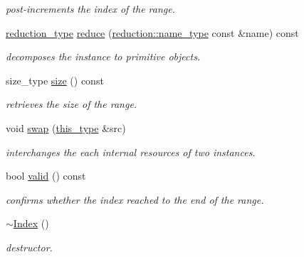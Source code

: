 \begin{DoxyCompactItemize}
\begin{DoxyCompactList}\small\item\em post-\/increments the index of the range. \end{DoxyCompactList}\item 
\hypertarget{classhryky_1_1_index_a5994b0481f6f94baa69e5f4c141b86a7}{\hyperlink{namespacehryky_a343a9a4c36a586be5c2693156200eadc}{reduction\-\_\-type} \hyperlink{classhryky_1_1_index_a5994b0481f6f94baa69e5f4c141b86a7}{reduce} (\hyperlink{namespacehryky_1_1reduction_ac686c30a4c8d196bbd0f05629a6b921f}{reduction\-::name\-\_\-type} const \&name) const }\label{classhryky_1_1_index_a5994b0481f6f94baa69e5f4c141b86a7}

\begin{DoxyCompactList}\small\item\em decomposes the instance to primitive objects. \end{DoxyCompactList}\item 
\hypertarget{classhryky_1_1_index_acbbc20fade7bd82b7ce253ef052a0e9c}{size\-\_\-type \hyperlink{classhryky_1_1_index_acbbc20fade7bd82b7ce253ef052a0e9c}{size} () const }\label{classhryky_1_1_index_acbbc20fade7bd82b7ce253ef052a0e9c}

\begin{DoxyCompactList}\small\item\em retrieves the size of the range. \end{DoxyCompactList}\item 
\hypertarget{classhryky_1_1_index_a5566075def89b43a67fc8d95ff257791}{void \hyperlink{classhryky_1_1_index_a5566075def89b43a67fc8d95ff257791}{swap} (\hyperlink{classhryky_1_1_index_a0dab4f087ed4d752f8d5040163782102}{this\-\_\-type} \&src)}\label{classhryky_1_1_index_a5566075def89b43a67fc8d95ff257791}

\begin{DoxyCompactList}\small\item\em interchanges the each internal resources of two instances. \end{DoxyCompactList}\item 
\hypertarget{classhryky_1_1_index_a81c0296f0896b3b6a012c948befd81dc}{bool \hyperlink{classhryky_1_1_index_a81c0296f0896b3b6a012c948befd81dc}{valid} () const }\label{classhryky_1_1_index_a81c0296f0896b3b6a012c948befd81dc}

\begin{DoxyCompactList}\small\item\em confirms whether the index reached to the end of the range. \end{DoxyCompactList}\item 
\hypertarget{classhryky_1_1_index_a1d2c73081a69849088ff400bc472cc44}{\hyperlink{classhryky_1_1_index_a1d2c73081a69849088ff400bc472cc44}{$\sim$\-Index} ()}\label{classhryky_1_1_index_a1d2c73081a69849088ff400bc472cc44}

\begin{DoxyCompactList}\small\item\em destructor. \end{DoxyCompactList}\end{DoxyCompactItemize}
